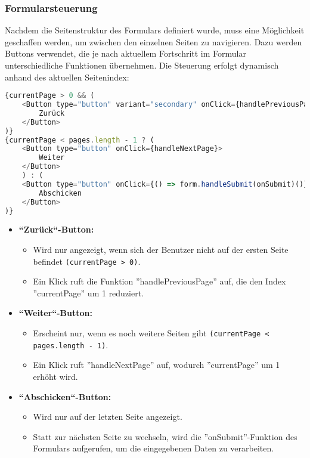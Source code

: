 \newpage

\subsubsection{Formularsteuerung} 
\label{sec:formularsteuerung}
Nachdem die Seitenstruktur des Formulars definiert wurde, muss eine Möglichkeit geschaffen werden, um zwischen den einzelnen Seiten zu navigieren. Dazu werden Buttons verwendet, die je nach aktuellem Fortschritt im Formular unterschiedliche Funktionen übernehmen. Die Steuerung erfolgt dynamisch anhand des aktuellen Seitenindex:

\begin{lstlisting}[language=JavaScript]
{currentPage > 0 && (
    <Button type="button" variant="secondary" onClick={handlePreviousPage}>
        Zurück
    </Button>
)}
{currentPage < pages.length - 1 ? (
    <Button type="button" onClick={handleNextPage}>
        Weiter
    </Button>
    ) : (
    <Button type="button" onClick={() => form.handleSubmit(onSubmit)()}>
        Abschicken
    </Button>
)}
\end{lstlisting}

\begin{itemize}
	\item \textbf{``Zurück``-Button:}  
	\begin{itemize}
		\item Wird nur angezeigt, wenn sich der Benutzer nicht auf der ersten Seite befindet \verb|(currentPage > 0)|.  
		\item Ein Klick ruft die Funktion ''handlePreviousPage'' auf, die den Index ''currentPage'' um 1 reduziert.  
	\end{itemize}
	
	\item \textbf{``Weiter``-Button:}  
	\begin{itemize}
		\item Erscheint nur, wenn es noch weitere Seiten gibt \verb|(currentPage < pages.length - 1)|.  
		\item Ein Klick ruft ''handleNextPage'' auf, wodurch ''currentPage'' um 1 erhöht wird.  
	\end{itemize}
	
	\item \textbf{``Abschicken``-Button:}  
	\begin{itemize}
		\item Wird nur auf der letzten Seite angezeigt.  
		\item Statt zur nächsten Seite zu wechseln, wird die ''onSubmit''-Funktion des Formulars aufgerufen, um die eingegebenen Daten zu verarbeiten.  
	\end{itemize}
\end{itemize}

